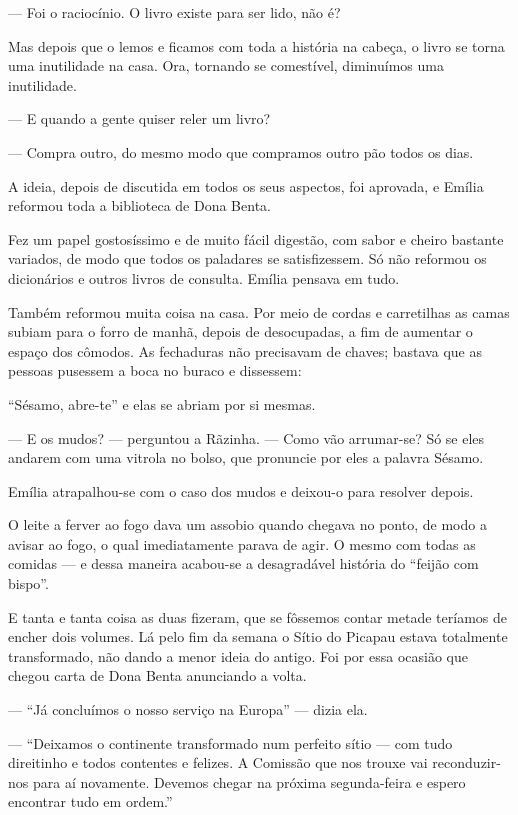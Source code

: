 --- Foi o raciocínio. O livro existe para ser lido, não é?

Mas depois que o lemos e ficamos com toda a história na cabeça, o livro
se torna uma inutilidade na casa. Ora, tornando se comestível,
diminuímos uma inutilidade.

--- E quando a gente quiser reler um livro?

--- Compra outro, do mesmo modo que compramos outro pão todos os dias.

A ideia, depois de discutida em todos os seus aspectos, foi aprovada, e
Emília reformou toda a biblioteca de Dona Benta.

Fez um papel gostosíssimo e de muito fácil digestão, com sabor e cheiro
bastante variados, de modo que todos os paladares se satisfizessem. Só
não reformou os dicionários e outros livros de consulta. Emília pensava
em tudo.

Também reformou muita coisa na casa. Por meio de cordas e carretilhas as
camas subiam para o forro de manhã, depois de desocupadas, a fim de
aumentar o espaço dos cômodos. As fechaduras não precisavam de chaves;
bastava que as pessoas pusessem a boca no buraco e dissessem:

``Sésamo, abre-te'' e elas se abriam por si mesmas.

--- E os mudos? --- perguntou a Rãzinha. --- Como vão arrumar-se? Só se
eles andarem com uma vitrola no bolso, que pronuncie por eles a palavra
Sésamo.

Emília atrapalhou-se com o caso dos mudos e deixou-o para resolver
depois.

O leite a ferver ao fogo dava um assobio quando chegava no ponto, de
modo a avisar ao fogo, o qual imediatamente parava de agir. O mesmo com
todas as comidas --- e dessa maneira acabou-se a desagradável história
do ``feijão com bispo''.

E tanta e tanta coisa as duas fizeram, que se fôssemos contar metade
teríamos de encher dois volumes. Lá pelo fim da semana o Sítio do
Picapau estava totalmente transformado, não dando a menor ideia do
antigo. Foi por essa ocasião que chegou carta de Dona Benta anunciando a
volta.

--- ``Já concluímos o nosso serviço na Europa'' --- dizia ela.

--- ``Deixamos o continente transformado num perfeito sítio --- com tudo
direitinho e todos contentes e felizes. A Comissão que nos trouxe vai
reconduzir-nos para aí novamente. Devemos chegar na próxima
segunda-feira e espero encontrar tudo em ordem.''

